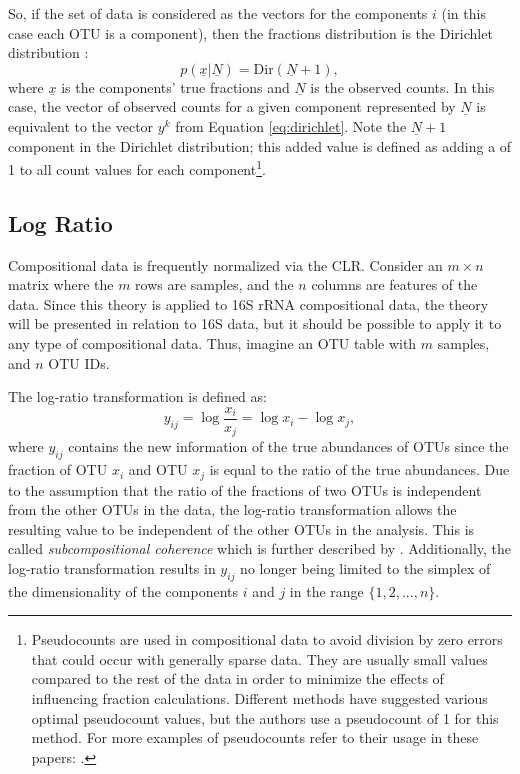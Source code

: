 So, if the set of data is considered as the vectors for the components $i$ (in this case each \acrshort{OTU} is a component), then the fractions distribution is the Dirichlet distribution \citep{Gelman2013}:
\begin{equation}\label{eq:dirichlet}
    p\left(\underline{x}|\underline{N}\right)=\text{Dir}\left(\underline{N}+1\right),
\end{equation}
where $\underline{x}$ is the components' true fractions and $\underline{N}$ is the observed counts. In this case, the vector of observed counts for a given component represented by $\underline{N}$ is equivalent to the vector $y^k$ from Equation \ref{eq:dirichlet}. Note the $\underline{N}+1$ component in the Dirichlet distribution; this added value is defined as adding a  of 1 to all count values for each component\footnote{Pseudocounts are used in compositional data to avoid division by zero errors that could occur with generally sparse data. They are usually small values compared to the rest of the data in order to minimize the effects of influencing fraction calculations. Different methods have suggested various optimal pseudocount values, but the authors use a pseudocount of 1 for this method. For more examples of pseudocounts refer to their usage in these papers: \citet{Weiss2017, Mandal2015, Wang2017}.}.


\subsection{Log Ratio}\label{theory-log}
Compositional data is frequently normalized via the \acrlong{CLR}. Consider an $m \times n$ matrix where the $m$ rows are samples, and the $n$ columns are features of the data. Since this theory is applied to 16S \acrshort{rRNA} compositional data, the theory will be presented in relation to 16S data, but it should be possible to apply it to any type of compositional data. Thus, imagine an \acrshort{OTU} table with $m$ samples, and $n$ \acrshort{OTU} IDs.


The log-ratio transformation is defined as:
\begin{equation} \label{eq:log}
    y_{ij} = \log \frac{x_i}{x_j} = \log x_i -\log x_j,
\end{equation}
where $y_{ij}$ contains the new information of the true abundances of \acrshort{OTU}s since the fraction of \acrshort{OTU} $x_i$ and \acrshort{OTU} $x_j$ is equal to the ratio of the true abundances. Due to the assumption that the ratio of the fractions of two \acrshort{OTU}s is independent from the other \acrshort{OTU}s in the data, the log-ratio transformation allows the resulting value to be independent of the other \acrshort{OTU}s in the analysis. This is called \textit{subcompositional coherence} which is further described by \citet{Aitchison2003}. Additionally, the log-ratio transformation results in $y_{ij}$ no longer being limited to the simplex of the dimensionality of the components $i$ and $j$ in the range $\{1,2,...,n\}$. 

